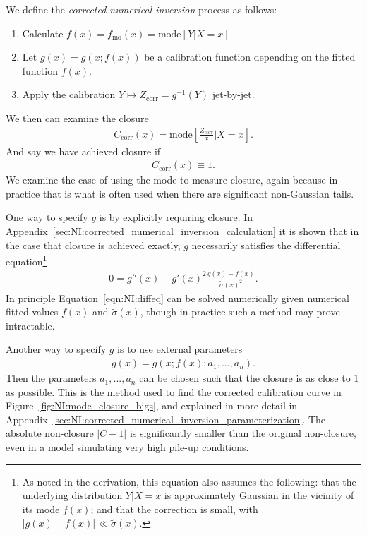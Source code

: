 We define the \emph{corrected numerical inversion} process as follows:
\begin{enumerate}
\item Calculate $f(x)=f_\text{mo}(x)=\text{mode}[Y|X=x]$.
\item Let $g(x) = g(x;f(x))$ be a calibration function depending on the fitted function $f(x)$.
\item Apply the calibration $Y\mapsto Z_\text{corr}=g^{-1}(Y)$ jet-by-jet.
\end{enumerate}
We then can examine the closure
\begin{align}
C_\text{corr}(x) = \text{mode}\left[\frac{Z_\text{corr}}{x}\Big|X=x\right].
\end{align}
And say we have achieved closure if
\begin{align}
C_\text{corr}(x) \equiv 1.
\end{align}
We examine the case of using the mode to measure closure, again because in practice that is what is often used when there are significant non-Gaussian tails. 

One way to specify $g$ is by explicitly requiring closure. In Appendix~\ref{sec:NI:corrected_numerical_inversion_calculation} it is shown that in the case that closure is achieved exactly, $g$ necessarily satisfies the differential equation\footnote{As noted in the derivation, this equation also assumes the following: that the underlying distribution $Y|X=x$ is approximately Gaussian in the vicinity of its mode $f(x)$; and that the correction is small, with $|g(x)-f(x)|\ll \tilde{\sigma}(x)$.}
\begin{align}
0=g''(x)-g'(x)^2\frac{g(x)-f(x)}{\tilde{\sigma}(x)^2}.
\label{eqn:NI:diffeq}
\end{align}
In principle Equation~\ref{eqn:NI:diffeq} can be solved numerically given numerical fitted values $f(x)$ and $\tilde{\sigma}(x)$, though in practice such a method may prove intractable.

Another way to specify $g$ is to use external parameters
\begin{align}
g(x) = g(x;f(x);a_1,...,a_n).
\end{align}
Then the parameters $a_1,...,a_n$ can be chosen such that the closure is as close to 1 as possible. This is the method used to find the corrected calibration curve in Figure~\ref{fig:NI:mode_closure_bigs}, and explained in more detail in Appendix~\ref{sec:NI:corrected_numerical_inversion_parameterization}. The absolute non-closure $|C-1|$ is significantly smaller than the original non-closure, even in a model simulating very high pile-up conditions.

